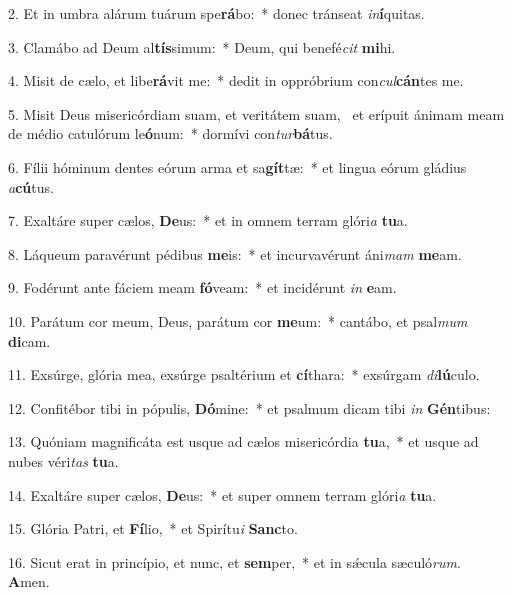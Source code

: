 2. Et in umbra alárum tuárum spe\textbf{rá}bo:~*  donec tránseat \textit{in}\textbf{í}quitas.\

3. Clamábo ad Deum al\textbf{tís}simum:~*  Deum, qui benefé\textit{cit} \textbf{mi}hi.\

4. Misit de cælo, et libe\textbf{rá}vit me:~*  dedit in oppróbrium con\textit{cul}\textbf{cán}tes me.\

5. Misit Deus misericórdiam suam, et veritátem suam, \dag\  et erípuit ánimam meam de médio catulórum le\textbf{ó}num:~*  dormívi con\textit{tur}\textbf{bá}tus.\

6. Fílii hóminum dentes eórum arma et sa\textbf{gít}tæ:~*  et lingua eórum gládius \textit{a}\textbf{cú}tus.\

7. Exaltáre super cælos, \textbf{De}us:~*  et in omnem terram glóri\textit{a} \textbf{tu}a.\

8. Láqueum paravérunt pédibus \textbf{me}is:~*  et incurvavérunt áni\textit{mam} \textbf{me}am.\

9. Fodérunt ante fáciem meam \textbf{fó}veam:~*  et incidérunt \textit{in} \textbf{e}am.\

10. Parátum cor meum, Deus, parátum cor \textbf{me}um:~*  cantábo, et psal\textit{mum} \textbf{di}cam.\

11. Exsúrge, glória mea, exsúrge psaltérium et \textbf{cí}thara:~*  exsúrgam \textit{di}\textbf{lú}culo.\

12. Confitébor tibi in pópulis, \textbf{Dó}mine:~*  et psalmum dicam tibi \textit{in} \textbf{Gén}tibus:\

13. Quóniam magnificáta est usque ad cælos misericórdia \textbf{tu}a,~*  et usque ad nubes véri\textit{tas} \textbf{tu}a.\

14. Exaltáre super cælos, \textbf{De}us:~*  et super omnem terram glóri\textit{a} \textbf{tu}a.\

15. Glória Patri, et \textbf{Fí}lio,~*  et Spirítu\textit{i} \textbf{Sanc}to.\

16. Sicut erat in princípio, et nunc, et \textbf{sem}per,~*  et in sǽcula sæculó\textit{rum}. \textbf{A}men.\

